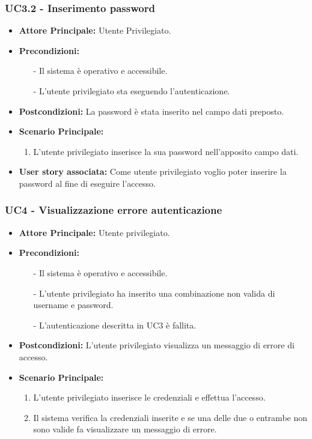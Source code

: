 \documentclass[11pt]{article}
\begin{document}
\begin{justify}
\subsubsection{\textbf{UC3.2 - Inserimento password}}
\begin{itemize}
     \item \textbf{Attore Principale:} Utente Privilegiato.
     \item \textbf{Precondizioni:} 
            \begin{itemize}
                \item [-] Il sistema è operativo e accessibile.
                \item [-] L'utente privilegiato sta eseguendo l'autenticazione.
            \end{itemize}
     \item \textbf{Postcondizioni:} La password è stata inserito nel campo dati preposto.
     \item \textbf{Scenario Principale:}
     \begin{enumerate}
         \item L'utente privilegiato inserisce la sua password nell'apposito campo dati.
     \end{enumerate}
     \item \textbf{User story associata:} Come utente privilegiato voglio poter inserire la password al fine di eseguire l'accesso.
\end{itemize}

\subsubsection{\textbf{UC4 - Visualizzazione errore autenticazione}}
\begin{itemize}
    \item \textbf{Attore Principale:} Utente privilegiato.
    \item \textbf{Precondizioni:}
            \begin{itemize}
                \item [-] Il sistema è operativo e accessibile.
                \item [-] L'utente privilegiato ha inserito una combinazione non valida di username e password.
                \item [-] L'autenticazione descritta in UC3 è fallita.
            \end{itemize}
    \item \textbf{Postcondizioni:} L'utente privilegiato visualizza un messaggio di errore di accesso.
    \item \textbf{Scenario Principale:}
            \begin{enumerate}
                \item L'utente privilegiato inserisce le credenziali e effettua l'accesso.
                \item Il sistema verifica la credenziali inserite e se una delle due o entrambe non sono valide fa visualizzare un messaggio di errore.
            \end{enumerate}
\end{itemize}



\end{justify}
\end{document}
